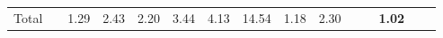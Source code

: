 \begin{tabular}{ll|rrrrrr|rrrrrrr}
  \hline
  Total  & &



  


  
  1.29 & 2.43 & 2.20 & 3.44 & 4.13 & 14.54 & 1.18 & 2.30 &  &  & \textbf{1.02} \\


\end{tabular}
